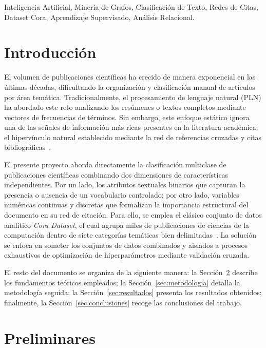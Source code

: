 \documentclass[conference,a4paper]{IEEEtran}
\begin{document}
\begin{IEEEkeywords}
  Inteligencia Artificial, Minería de Grafos, Clasificación de Texto, Redes de Citas, Dataset Cora, Aprendizaje Supervisado, Análisis Relacional.
\end{IEEEkeywords}


\section{Introducción}

El volumen de publicaciones científicas ha crecido de manera exponencial 
en las últimas décadas, dificultando la organización y clasificación manual 
de artículos por área temática. Tradicionalmente, el procesamiento de lenguaje natural (PLN) ha abordado este reto 
analizando los resúmenes o textos completos mediante vectores de frecuencias de términos. Sin embargo, este enfoque estático ignora una de las señales de 
información más ricas presentes en la literatura académica: el hipervínculo natural establecido mediante la red de referencias cruzadas y citas bibliográficas~\cite{yang2015network}.

El presente proyecto aborda directamente la 
clasificación multiclase de publicaciones científicas combinando dos dimensiones de características independientes. Por un lado, los atributos 
textuales binarios que capturan la presencia o ausencia de un vocabulario controlado; por otro lado, variables numéricas continuas y discretas que 
formalizan la importancia estructural del documento en su red de citación. Para ello, se emplea el clásico conjunto de datos analítico \emph{Cora Dataset}, 
el cual agrupa miles de publicaciones de ciencias de la computación dentro de siete categorías temáticas bien delimitadas~\cite{mccallum2024}. La solución se enfoca en someter 
los conjuntos de datos combinados y aislados a procesos exhaustivos de optimización de hiperparámetros mediante validación cruzada.

El resto del documento se organiza de la siguiente manera: la 
Sección~\ref{sec:preliminares} describe los fundamentos teóricos empleados; 
la Sección~\ref{sec:metodologia} detalla la metodología seguida; 
la Sección~\ref{sec:resultados} presenta los resultados 
obtenidos; finalmente, la Sección~\ref{sec:conclusiones} recoge las 
conclusiones del trabajo.

\section{Preliminares}
\label{sec:preliminares}
\end{document}
